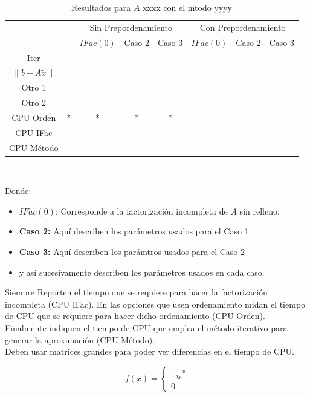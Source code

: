 \documentclass{article}
\begin{document}
\begin{enumerate}
\begin{table}[H]
\begin{tabular}{|c||c||c|c|c||c|c|c|}
\cline{3-8}

& & \multicolumn{3}{|c||}{Sin Prepordenamiento} &

\multicolumn{3}{c|}{Con Prepordenamiento} \\

\cline{3-8}

& & $IFac(0)$ & Caso 2 & Caso 3 &

$IFac(0)$ & Caso 2 & Caso 3 \\ \hline \hline

Iter & & & & & & & \\

$\|b-A\widetilde{x}\|$ & & & & & & & \\

Otro 1 & & & & & & & \\

Otro 2 & & & & & & & \\

CPU Orden & * & * & * & * & & & \\

CPU IFac & & & & & & & \\

CPU Método & & & & & & & \\ 
\hline

\end{tabular} \\

\caption{Resultados para $A$ xxxx con el mtodo yyyy}

\label{tab:T1}

\end{table}
Donde:
\begin{itemize}
\item $IFac(0)$: Corresponde a la factorización incompleta de $A$ sin relleno.
\item {\bf Caso 2:} Aquí describen los parámetros usados para el Caso 1
\item {\bf Caso 3:} Aquí describen los parámtros usados para el Caso 2
\item y así sucesivamente describen los parámetros usados en cada caso.
\end{itemize}
Siempre Reporten el tiempo que se requiere para hacer la factorización incompleta (CPU IFac). En las opciones que usen ordenamiento midan el tiempo de CPU que se requiere para hacer dicho ordenamiento (CPU Orden). Finalmente indiquen el tiempo de CPU que emplea el método iterativo para generar la aproximación (CPU Método).\\
Deben usar matrices grandes para poder ver diferencias en el tiempo de CPU.
\end{enumerate}
$$f(x) =
\left\lbrace\begin{matrix}
\frac{1-x}{2x}\\
0
\end{matrix}\right.$$
\end{document}
